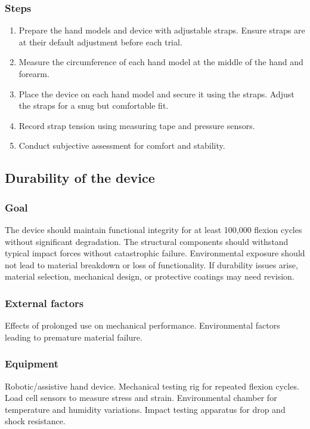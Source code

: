 \documentclass{article}
\begin{document}
\subsubsection{Steps}
\begin{enumerate}
    \item Prepare the hand models and device with adjustable straps. Ensure straps are at their default adjustment before each trial.
    \item Measure the circumference of each hand model at the middle of the hand and forearm.
    \item Place the device on each hand model and secure it using the straps. Adjust the straps for a snug but comfortable fit.
    \item Record strap tension using measuring tape and pressure sensors.
    \item Conduct subjective assessment for comfort and stability.
\end{enumerate}

\subsection{Durability of the device}

\subsubsection{Goal} The device should maintain functional integrity for at least 100,000 flexion cycles without significant degradation. The structural components should withstand typical impact forces without catastrophic failure. Environmental exposure should not lead to material breakdown or loss of functionality. If durability issues arise, material selection, mechanical design, or protective coatings may need revision.

\subsubsection{External factors} Effects of prolonged use on mechanical performance. Environmental factors leading to premature material failure.

\subsubsection{Equipment} Robotic/assistive hand device. Mechanical testing rig for repeated flexion cycles. Load cell sensors to measure stress and strain. Environmental chamber for temperature and humidity variations. Impact testing apparatus for drop and shock resistance.
\end{document}
